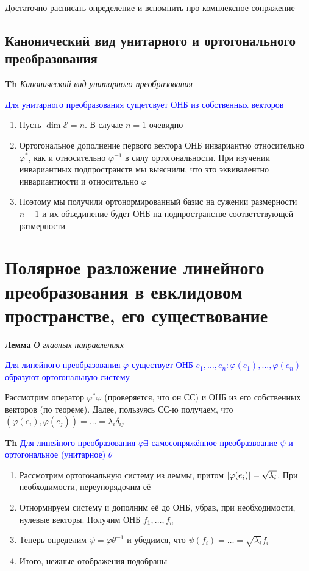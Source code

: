 \documentclass[a4paper, 14pt]{article}
\begin{document}
    Достаточно расписать определение и вспомнить про комплексное сопряжение

    \subsection{Канонический вид унитарного и ортогонального преобразования}

    \textbf{Th} \textit{Канонический вид унитарного преобразования}

    \textcolor{blue}{Для унитарного преобразования сущетсвует ОНБ из собственных векторов}

    \begin{enumerate}
        \item Пусть $\dim \mathscr{E} = n$.
        В случае $n = 1$ очевидно
        \item Ортогональное дополнение первого вектора ОНБ инвариантно относительно $\varphi^*$, как и относительно $\varphi^{-1}$ в
        силу ортогональности.
        При изучении инвариантных подпространств мы выяснили, что это эквивалентно инвариантности и относительно $\varphi$
        \item Поэтому мы получили ортонормированный базис на сужении размерности $n - 1$ и их объединение будет ОНБ на
        подпространстве соответствующей размерности
    \end{enumerate}


    \section{Полярное разложение линейного преобразования в евклидовом пространстве, его существование}

    \textbf{Лемма} \textit{О главных направлениях}

    \textcolor{blue}{Для линейного преобразования $\varphi$ существует
    ОНБ $e_1, \dots, e_n: \varphi(e_1), \dots, \varphi(e_n)$ образуют ортогональную систему}

    Рассмотрим оператор $\varphi^* \varphi$ (проверяется, что он СС) и ОНБ из его собственных векторов (по теореме).
    Далее, пользуясь СС-ю получаем, что $(\varphi(e_i), \varphi(e_j)) = \dots = \lambda_i \delta_{ij}$

    \textbf{Th} \textcolor{blue}{Для линейного преобразования $\varphi \exists$ самосопряжённое
    преобразвоание $\psi$ и ортогональное (унитарное) $\theta$}

    \begin{enumerate}
        \item Рассмотрим ортогональную систему из леммы, притом $\abs{\varphi(e_i)} = \sqrt{\lambda_i}$.
        При необходимости, переупорядочим её
        \item Отнормируем систему и дополним её до ОНБ, убрав, при необходимости, нулевые векторы.
        Получим ОНБ $f_1, \dots, f_n$
        \item Теперь определим $\psi = \varphi \theta^{-1}$ и убедимся, что $\psi(f_i) = \dots = \sqrt{\lambda_i} f_i$
        \item Итого, нежные отображения подобраны
    \end{enumerate}
\end{document}

